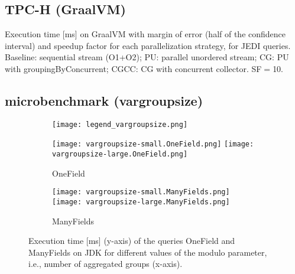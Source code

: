 \documentclass{article}
\begin{document}
\subsection{TPC-H (GraalVM)}
\begin{table}[h!]
    \centering
    
     \caption{Execution time [ms] on GraalVM with margin of error (half of the confidence interval)
      and speedup factor for each parallelization strategy, for JEDI queries.
      Baseline: sequential stream (O1+O2); PU: parallel unordered stream; CG: PU with groupingByConcurrent; CGCC: CG with concurrent collector. SF$=$10.}
\end{table}


\newpage
\subsection{microbenchmark (vargroupsize)}
\begin{figure*}[h!]
    \centering

    \begin{subfigure}[b]{0.6\textwidth}
        \centering
        \texttt{[image: legend\_vargroupsize.png]}
    \end{subfigure}

    \begin{subfigure}[b]{0.98\textwidth}
        \centering
        \texttt{[image: vargroupsize-small.OneField.png]}
        \texttt{[image: vargroupsize-large.OneField.png]}
        \caption{OneField}
    \end{subfigure}

    \begin{subfigure}[b]{0.98\textwidth}
        \centering
        \texttt{[image: vargroupsize-small.ManyFields.png]}
        \texttt{[image: vargroupsize-large.ManyFields.png]}
        \caption{ManyFields}
    \end{subfigure}

    \caption{Execution time [ms] (y-axis) of the queries OneField and ManyFields on JDK for different values of the modulo parameter, i.e., number of aggregated groups (x-axis).}
\end{figure*}

\newpage
\end{document}
